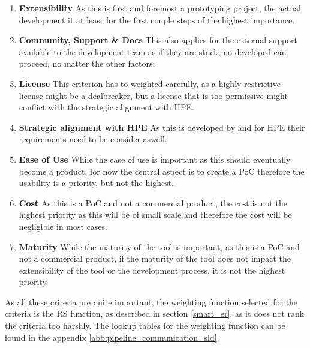 \begin{enumerate}
    \item \textbf{ Extensibility } As this is first and foremost a prototyping project, the actual development it at least for the first couple steps of the highest importance. 
    \item \textbf{ Community, Support \& Docs } This also applies for the external support available to the development team as if they are stuck, no developed can proceed, no matter the other factors.
    \item \textbf{ License } This criterion has to weighted carefully, as a highly restrictive license might be a dealbreaker, but a license that is too permissive might conflict with the strategic alignment with \ac{HPE}.
    \item \textbf{ Strategic alignment with \ac{HPE} } As this is developed by and for \ac{HPE} their requirements need to be consider aswell.
    \item \textbf{ Ease of Use } While the ease of use is important as this should eventually become a product, for now the central aspect is to create a \ac{PoC} therefore the usability is a priority, but not the highest.
    \item \textbf{ Cost } As this is a \ac{PoC} and not a commercial product, the cost is not the highest priority as this will be of small scale and therefore the cost will be negligible in most cases.
    \item \textbf{ Maturity } While the maturity of the tool is important, as this is a \ac{PoC} and not a commercial product, if the maturity of the tool does not impact the extensibility of the tool or the development process, it is not the highest priority.
\end{enumerate}

As all these criteria are quite important, the weighting function selected for the criteria is the \ac{RS} function, as described in section \ref{smart_er}, 
as it does not rank the criteria too harshly.
The lookup tables for the weighting function can be found in the appendix \ref{abb:pipeline_communication_sld}.

